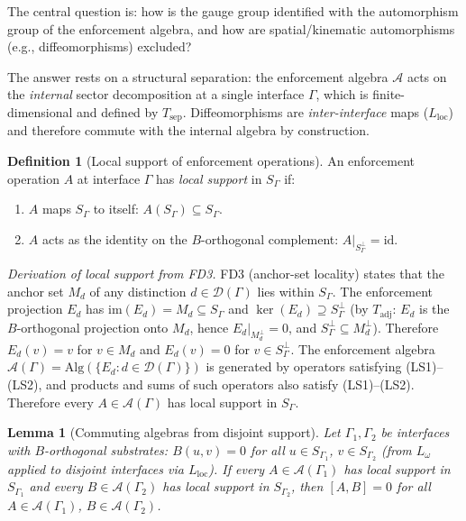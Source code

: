 \documentclass[11pt,a4paper]{article}
\newtheorem{lemma}[theorem]{Lemma}
\theoremstyle{definition}
\newtheorem{definition}[theorem]{Definition}
\begin{document}
The central question is: how is the gauge group identified with the
automorphism group of the enforcement algebra, and how are
spatial/kinematic automorphisms (e.g., diffeomorphisms) excluded?

The answer rests on a structural separation: the enforcement algebra
$\mathcal{A}$ acts on the \emph{internal} sector decomposition at a
single interface $\Gamma$, which is finite-dimensional and defined by
$T_{\mathrm{sep}}$.  Diffeomorphisms are \emph{inter-interface} maps
($L_{\mathrm{loc}}$) and therefore commute with the internal algebra
by construction.

\begin{definition}[Local support of enforcement operations]\label{def:local_support}
An enforcement operation $A$ at interface $\Gamma$ has \emph{local
support} in $S_\Gamma$ if:
\begin{enumerate}[label=(LS\arabic*),nosep]
  \item $A$ maps $S_\Gamma$ to itself: $A(S_\Gamma) \subseteq S_\Gamma$.
  \item $A$ acts as the identity on the $B$-orthogonal complement:
  $A|_{S_\Gamma^\perp} = \mathrm{id}$.
\end{enumerate}
\end{definition}

\noindent\textit{Derivation of local support from FD3.}\quad
FD3 (anchor-set locality) states that the anchor set $M_d$ of any
distinction $d \in \mathcal{D}(\Gamma)$ lies within $S_\Gamma$.
The enforcement projection $E_d$ has $\mathrm{im}(E_d) = M_d
\subseteq S_\Gamma$ and $\ker(E_d) \supseteq S_\Gamma^\perp$ (by
$T_{\mathrm{adj}}$: $E_d$ is the $B$-orthogonal projection onto $M_d$,
hence $E_d|_{M_d^\perp} = 0$, and $S_\Gamma^\perp \subseteq M_d^\perp$).
Therefore $E_d(v) = v$ for $v \in M_d$ and $E_d(v) = 0$ for
$v \in S_\Gamma^\perp$.  The enforcement algebra
$\mathcal{A}(\Gamma) = \mathrm{Alg}(\{E_d : d \in \mathcal{D}(\Gamma)\})$
is generated by operators satisfying (LS1)--(LS2), and products and sums
of such operators also satisfy (LS1)--(LS2).  Therefore every
$A \in \mathcal{A}(\Gamma)$ has local support in $S_\Gamma$.

\begin{lemma}[Commuting algebras from disjoint support]
\label{lem:loc_commut}
Let $\Gamma_1, \Gamma_2$ be interfaces with $B$-orthogonal substrates:
$B(u, v) = 0$ for all $u \in S_{\Gamma_1}$, $v \in S_{\Gamma_2}$
(from $L_\omega$ applied to disjoint interfaces via $L_{\mathrm{loc}}$).
If every $A \in \mathcal{A}(\Gamma_1)$ has local support in
$S_{\Gamma_1}$ and every $B \in \mathcal{A}(\Gamma_2)$ has local
support in $S_{\Gamma_2}$, then $[A, B] = 0$ for all
$A \in \mathcal{A}(\Gamma_1)$, $B \in \mathcal{A}(\Gamma_2)$.
\end{lemma}
\end{document}
